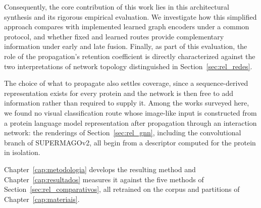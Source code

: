 \documentclass[Ingles]{ic-tese-v3}
\begin{document}
Consequently, the core contribution of this work lies in this architectural synthesis and its rigorous empirical evaluation. We investigate how this simplified approach compares with implemented learned graph encoders under a common protocol, and whether fixed and learned routes provide complementary information under early and late fusion. Finally, as part of this evaluation, the role of the propagation's retention coefficient is directly characterized against the two interpretations of network topology distinguished in Section~\ref{sec:rel_redes}.

The choice of what to propagate also settles coverage, since a sequence-derived representation exists
for every protein and the network is then free to add information rather than required to supply it.
Among the works surveyed here, we found no visual classification route whose image-like input is
constructed from a protein language model representation after propagation through an interaction
network: the renderings of Section~\ref{sec:rel_gnn}, including the convolutional branch of
SUPERMAGOv2, all begin from a descriptor computed for the protein in isolation.

Chapter~\ref{cap:metodologia} develops the resulting method and Chapter~\ref{cap:resultados} measures
it against the five methods of Section~\ref{sec:rel_comparativos}, all retrained on the corpus and
partitions of Chapter~\ref{cap:materiais}.

\end{document}
